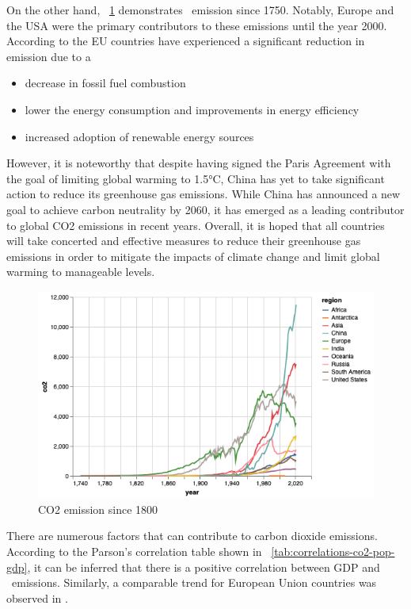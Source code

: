 \newpage 
On the other hand, ~\ref{fig:co2_emission_by_region} demonstrates \coo\ emission since 1750. 
Notably, Europe and the USA were the primary contributors to these emissions until the year 2000. 
According to the \cite{why-are-greenhouse-gases-decreasing} EU countries have experienced a significant reduction in emission due to a 
\begin{itemize}
  \item decrease in fossil fuel combustion
  \item lower the energy consumption and improvements in energy efficiency
  \item increased adoption of renewable energy sources
\end{itemize}
However, it is noteworthy that despite having signed the Paris Agreement with the goal of limiting global warming to 1.5°C, China has yet to take significant action to reduce its greenhouse gas emissions. While China has announced a new goal to achieve carbon neutrality by 2060, it has emerged as a leading contributor to global CO2 emissions in recent years.
\newline
Overall, it is hoped that all countries will take concerted and effective measures to reduce their greenhouse gas emissions in order to mitigate the impacts of climate change and limit global warming to manageable levels.

\begin{figure}[h]
  \includegraphics[width=\linewidth]{img/co2emission_by_region.png}
  \caption{CO2 emission since 1800}
  \label{fig:co2_emission_by_region}
\end{figure}

There are numerous factors that can contribute to carbon dioxide emissions. According to the Parson's correlation table shown in ~\ref{tab:correlations-co2-pop-gdp}, it can be inferred that there is a positive correlation between GDP and \coo\ emissions.
Similarly, a comparable trend for European Union countries was observed in \cite{relation-between-co2-gdp}.

